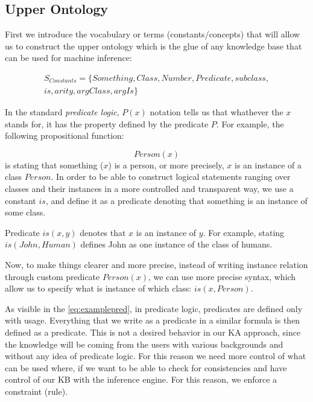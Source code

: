 \subsection{Upper Ontology}
\label{section:upperOnto}
First we introduce the vocabulary or terms (constants/concepts) that will allow 
us to construct the upper ontology which is the glue of any knowledge base that 
can be used for machine inference:

\begin{equation}\label{set:terms}
\begin{gathered}
S_{Constants} = \{Something, Class, Number, Predicate, subclass, \\
	is, arity, argClass, argIs\}
\end{gathered}
\end{equation}

In the standard \emph{predicate logic}, $P(x)$ notation tells us that whathever 
the $x$ stands for, it has the property defined by the predicate $P$. 
For example, the following propositional function:

\begin{equation}\label{eq:examplepred}
Person(x)
\end{equation}
is stating that something ($x$) is a person, or more precisely, $x$ is an 
instance of a class $Person$. In order to be able to construct logical 
statements ranging
over classes and their instances in a more controlled and transparent way, we
use a constant $is$, and define it as a predicate denoting that something is an
instance of some class.

\begin{definition}[predicate "$is$"]
\label{const:is}
Predicate $is(x,y)$ denotes that $x$ is an instance of $y$. For example, 
stating $is(John, Human)$ defines John as one instance of the class of humans.
\end{definition}
Now, to make things clearer and more precise, instead of writing instance
relation through custom predicate $Person(x)$, we can use more precise syntax, 
which allow us to specify what is instance of which class: $is(x,Person)$.

As visible in the \autoref{eq:examplepred}, in predicate logic, predicates are
defined only with usage. Everything that we write as a predicate in a similar
formula is then defined as a predicate. This is not a desired behavior in our 
KA approach, since the knowledge will be coming from the users with various
backgrounds and without any idea of predicate logic. For this reason we
need more control of what can be used where, if we want to be able to
check for consistencies and have control of our KB with the inference engine.
For this reason, we enforce a constraint (rule).

